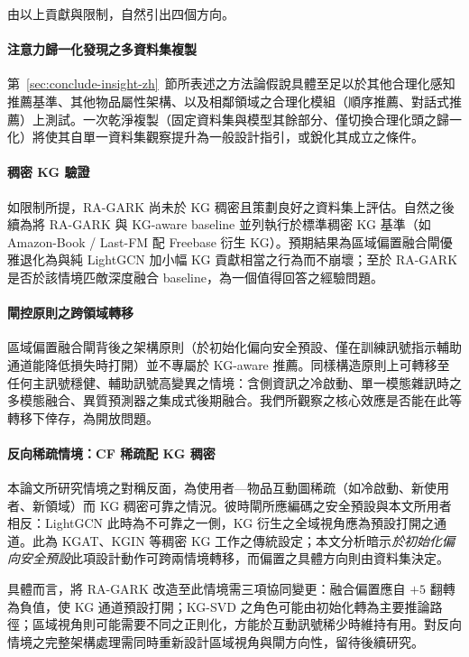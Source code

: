 由以上貢獻與限制，自然引出四個方向。

\paragraph{注意力歸一化發現之多資料集複製} 第~\ref{sec:conclude-insight-zh}~節所表述之方法論假說具體至足以於其他合理化感知推薦基準、其他物品屬性架構、以及相鄰領域之合理化模組（順序推薦、對話式推薦）上測試。一次乾淨複製（固定資料集與模型其餘部分、僅切換合理化頭之歸一化）將使其自單一資料集觀察提升為一般設計指引，或銳化其成立之條件。

\paragraph{稠密 KG 驗證} 如限制所提，RA-GARK 尚未於 KG 稠密且策劃良好之資料集上評估。自然之後續為將 RA-GARK 與 KG-aware baseline 並列執行於標準稠密 KG 基準（如 Amazon-Book / Last-FM 配 Freebase 衍生 KG）。預期結果為區域偏置融合閘優雅退化為與純 LightGCN 加小幅 KG 貢獻相當之行為而不崩壞；至於 RA-GARK 是否於該情境匹敵深度融合 baseline，為一個值得回答之經驗問題。

\paragraph{閘控原則之跨領域轉移} 區域偏置融合閘背後之架構原則（於初始化偏向安全預設、僅在訓練訊號指示輔助通道能降低損失時打開）並不專屬於 KG-aware 推薦。同樣構造原則上可轉移至任何主訊號穩健、輔助訊號高變異之情境：含側資訊之冷啟動、單一模態雜訊時之多模態融合、異質預測器之集成式後期融合。我們所觀察之核心效應是否能在此等轉移下倖存，為開放問題。

\paragraph{反向稀疏情境：CF 稀疏配 KG 稠密} 本論文所研究情境之對稱反面，為使用者—物品互動圖稀疏（如冷啟動、新使用者、新領域）而 KG 稠密可靠之情況。彼時閘所應編碼之安全預設與本文所用者相反：LightGCN 此時為不可靠之一側，KG 衍生之全域視角應為預設打開之通道。此為 KGAT、KGIN 等稠密 KG 工作之傳統設定；本文分析暗示\emph{於初始化偏向安全預設}此項設計動作可跨兩情境轉移，而偏置之具體方向則由資料集決定。

具體而言，將 RA-GARK 改造至此情境需三項協同變更：融合偏置應自 $+5$ 翻轉為負值，使 KG 通道預設打開；KG-SVD 之角色可能由初始化轉為主要推論路徑；區域視角則可能需要不同之正則化，方能於互動訊號稀少時維持有用。對反向情境之完整架構處理需同時重新設計區域視角與閘方向性，留待後續研究。
